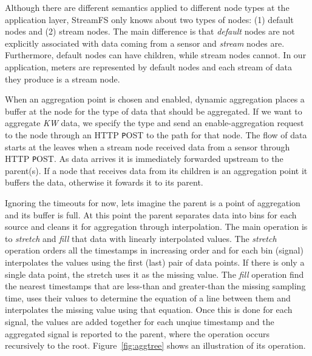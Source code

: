 Although there are different semantics applied to different node types at the application layer, StreamFS only knows
about two types of nodes: (1) default nodes and (2) stream nodes.  The main difference is that \emph{default} nodes
are not explicitly associated with data coming from a sensor and \emph{stream} nodes are.  Furthermore, default
nodes can have children, while stream nodes cannot.  In our application, meters are represented by default nodes
and each stream of data they produce is a stream node.

When an aggregation point is chosen and enabled, dynamic aggregation places a buffer at the node for the type
of data that should be aggregated.  If we want to aggregate \emph{KW} data, we specify the type and send an enable-aggregation
request to the node through an HTTP {\texttt POST} to the path for that node.  The flow of data starts at the leaves when
a stream node received data from a sensor through HTTP {\texttt POST}.  As data arrives it is immediately
forwarded upstream to the parent(s).  If a node that receives data from its children is an aggregation point it buffers
the data, otherwise it fowards it to its parent.

Ignoring the timeouts for now, lets imagine the parent is a point of aggregation and its buffer is full.  At this point
the parent separates data into bins for each source and cleans it for aggregation through interpolation.  The main
operation is to \emph{stretch} and \emph{fill} that data with linearly interpolated values.  The \emph{stretch}
operation orders all the timestamps in increasing order and for each bin (signal) interpolates the values using the
first (last) pair of data points.  If there is only a single data point, the stretch uses it as the missing value.
The \emph{fill} operation find the nearest timestamps that are less-than and greater-than the missing sampling time, 
uses their values to determine the equation of a line between them and interpolates the missing value using that equation.
Once this is done for each signal, the values are added together for each unqiue timestamp and the aggregated
signal is reported to the parent, where the operation occurs recursively to the root.
Figure~\ref{fig:aggtree} shows an illustration of its operation.  



